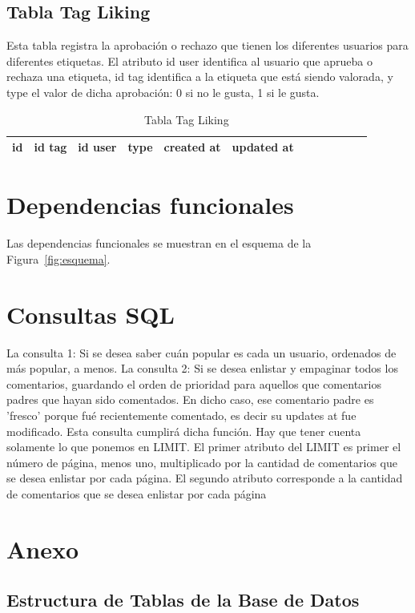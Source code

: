 \documentclass[12pt,letterpaper]{article}
\begin{document}
\subsection{Tabla Tag Liking}
Esta tabla registra la aprobación o rechazo que tienen los diferentes usuarios para diferentes etiquetas. El atributo id user identifica al usuario que aprueba o rechaza una etiqueta, id tag identifica a la etiqueta que está siendo valorada, y type el valor de dicha aprobación: 0 si no le gusta, 1 si le gusta.

\begin{table}[!ht]  
\begin{center}	
	\begin{tabular}{||c|l|l|l|l|l|l|l|l|l|l|l||} \hline 
	id & id tag & id user & type & created at & updated at \\ \hline
	\end{tabular}
	\caption {Tabla Tag Liking}
\end{center}  
\end{table}


\section{Dependencias funcionales}

Las dependencias funcionales se muestran en el esquema de la Figura~\ref{fig:esquema}.

\section{Consultas SQL}

La consulta 1: Si se desea saber cuán popular es cada un usuario, ordenados de más popular, a menos.
La consulta 2: Si se desea enlistar y empaginar todos los comentarios, guardando el orden de prioridad para aquellos que comentarios padres que hayan sido comentados. En dicho caso, ese comentario padre es 'fresco' porque fué recientemente comentado, es decir su updates at fue modificado. Esta consulta cumplirá dicha función. Hay que tener cuenta solamente lo que ponemos en LIMIT. El primer atributo del LIMIT es primer el número de página, menos uno, multiplicado por la cantidad de comentarios que se desea enlistar por cada página. El segundo atributo corresponde a la cantidad de comentarios que se desea enlistar por cada página


\section{Anexo}
\subsection{Estructura de Tablas de la Base de Datos}
\end{document}
